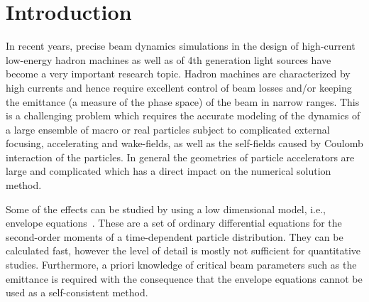 \section{Introduction}
\label{sec:intro}

In recent years, precise beam dynamics simulations in the design of
high-current low-energy hadron machines as well as of 4th generation
light sources have become a very important research topic.  Hadron
machines are characterized by high currents and hence require excellent
control of beam losses and/or keeping the emittance (a measure of the
phase space) of the beam in narrow ranges.  This is a challenging
problem which requires the accurate modeling of the dynamics of a large
ensemble of macro or real particles subject to complicated external
focusing, accelerating and wake-fields, as well as the self-fields
caused by Coulomb interaction of the particles.  In general the
geometries of particle accelerators are large and complicated which has
a direct impact on the numerical solution method.

Some of the effects can be studied by using a low dimensional model,
i.e., envelope equations~\cite{sach:68, sach:71, stru-reis:1984,
  gluckstern1}.  These are a set of ordinary differential equations for
the second-order moments of a time-dependent particle distribution.
They can be calculated fast, however the level of detail is mostly not
sufficient for quantitative studies.  Furthermore, a priori knowledge of
critical beam parameters such as the emittance is required with the consequence that the
envelope equations cannot be used as a self-consistent method.

